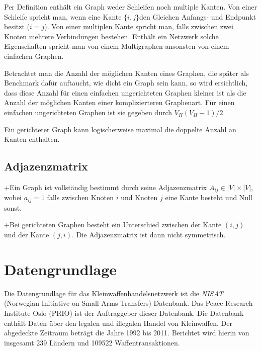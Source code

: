 \documentclass[a4paper,ngerman,oneside,titlepage,bibliography=totoc,11pt]{scrreprt}
\begin{document}
Per Definition enthält ein Graph weder Schleifen noch multiple Kanten. Von einer Schleife spricht man, wenn eine Kante $\{i,j\}$den Gleichen Anfangs- und Endpunkt besitzt ($i = j$). Von einer multiplen Kante spricht man, falls zwischen zwei Knoten mehrere Verbindungen bestehen. Enthält ein Netzwerk solche Eigenschaften spricht man von einem Multigraphen ansonsten von einem einfachen Graphen.

Betrachtet man die Anzahl der möglichen Kanten eines Graphen, die später als Benchmark dafür auftaucht, wie dicht ein Graph sein kann, so wird ersichtlich, dass diese Anzahl für einen einfachen ungerichteten Graphen kleiner ist als die Anzahl der möglichen Kanten einer komplizierteren Graphenart. Für einen einfachen ungerichteten Graphen ist sie gegeben durch $V_H(V_H-1)/2$.

Ein gerichteter Graph kann logischerweise maximal die doppelte Anzahl an Kanten enthalten.

\subsection{Adjazenzmatrix}

+Ein Graph ist vollständig bestimmt durch seine Adjazenzmatrix $A_{ij} \in |V| \times |V|$, wobei $a_{ij} = 1$ falls zwischen Knoten $i$ und Knoten $j$ eine Kante besteht und Null sonst.

+Bei gerichteten Graphen besteht ein Unterschied zwischen der Kante $(i,j)$ und der Kante $(j,i)$. Die Adjazenzmatrix ist dann nicht symmetrisch.


\section{Datengrundlage}



Die Datengrundlage für das Kleinwaffenhandelsnetzwerk ist die \emph{NISAT} (Norwegian Initiative on Small Arms Transfers) Datenbank. Das Peace Research Institute Oslo (PRIO) ist der Auftraggeber dieser Datenbank. Die Datenbank enthält Daten über den legalen und illegalen Handel von Kleinwaffen. Der abgedeckte Zeitraum beträgt die Jahre 1992 bis 2011. Berichtet wird hierin von insgesamt 239 Ländern und 109522 Waffentransaktionen.
\end{document}
